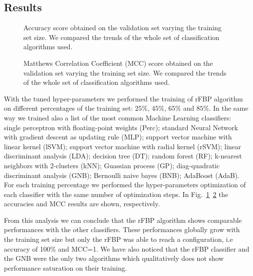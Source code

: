 \documentclass{standalone}
\begin{document}
\subsection[Results]{Results}\label{rfbp:snp_result}

\begin{figure}[htbp]
\centering
\def\svgwidth{\textwidth}

\caption{Accuracy score obtained on the validation set varying the training set size.
We compared the trends of the whole set of classification algorithms used.
}
\label{fig:confronto_bestclassificatoriACC}
\end{figure}


\begin{figure}[htbp]
\centering
\def\svgwidth{\textwidth}

\caption{Matthews Correlation Coefficient (MCC) score obtained on the validation set varying the training set size.
We compared the trends of the whole set of classification algorithms used.
}
\label{fig:confronto_bestclassificatoriMCC}
\end{figure}

With the tuned hyper-parameters we performed the training of rFBP algorithm on different percentages of the training set: $25\%$, $45\%$, $65\%$ and $85\%$.
In the same way we trained also a list of the most common Machine Learning classifiers: single perceptron with floating-point weights (Perc); standard Neural Network with gradient descent as updating rule (MLP); support vector machine with linear kernel (lSVM); support vector machine with radial kernel (rSVM); linear discriminant analysis (LDA); decision tree (DT); random forest (RF); k-nearest neighbors with 2-clusters (kNN); Guassian process (GP); diag-quadratic discriminant analysis (GNB); Bernoulli naive bayes (BNB); AdaBoost (AdaB).
For each training percentage we performed the hyper-parameters optimization of each classifier with the same number of optimization steps.
In Fig.~\ref{fig:confronto_bestclassificatoriACC}~\ref{fig:confronto_bestclassificatoriMCC} the accuracies and MCC results are shown, respectively.

From this analysis we can conclude that the rFBP algorithm shows comparable performances with the other classifiers.
These performances globally grow with the training set size but only the rFBP was able to reach a  configuration, i.e accuracy of 100\% and MCC=1.
We have also noticed that the rFBP classifier and the GNB were the only two algorithms which qualitatively does not show performance saturation on their training.
\end{document}
